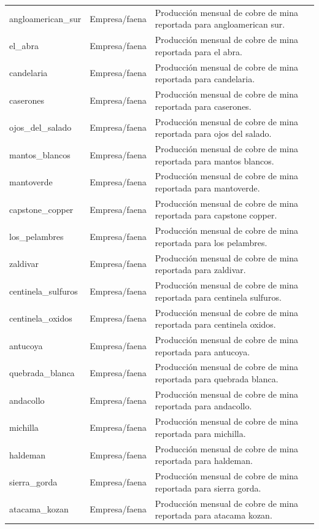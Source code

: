 \begin{longtable}{p{}p{}p{}}
angloamerican\_sur & Empresa/faena & Producción mensual de cobre de mina reportada para angloamerican sur. \\
el\_abra & Empresa/faena & Producción mensual de cobre de mina reportada para el abra. \\
candelaria & Empresa/faena & Producción mensual de cobre de mina reportada para candelaria. \\
caserones & Empresa/faena & Producción mensual de cobre de mina reportada para caserones. \\
ojos\_del\_salado & Empresa/faena & Producción mensual de cobre de mina reportada para ojos del salado. \\
mantos\_blancos & Empresa/faena & Producción mensual de cobre de mina reportada para mantos blancos. \\
mantoverde & Empresa/faena & Producción mensual de cobre de mina reportada para mantoverde. \\
capstone\_copper & Empresa/faena & Producción mensual de cobre de mina reportada para capstone copper. \\
los\_pelambres & Empresa/faena & Producción mensual de cobre de mina reportada para los pelambres. \\
zaldivar & Empresa/faena & Producción mensual de cobre de mina reportada para zaldivar. \\
centinela\_sulfuros & Empresa/faena & Producción mensual de cobre de mina reportada para centinela sulfuros. \\
centinela\_oxidos & Empresa/faena & Producción mensual de cobre de mina reportada para centinela oxidos. \\
antucoya & Empresa/faena & Producción mensual de cobre de mina reportada para antucoya. \\
quebrada\_blanca & Empresa/faena & Producción mensual de cobre de mina reportada para quebrada blanca. \\
andacollo & Empresa/faena & Producción mensual de cobre de mina reportada para andacollo. \\
michilla & Empresa/faena & Producción mensual de cobre de mina reportada para michilla. \\
haldeman & Empresa/faena & Producción mensual de cobre de mina reportada para haldeman. \\
sierra\_gorda & Empresa/faena & Producción mensual de cobre de mina reportada para sierra gorda. \\
atacama\_kozan & Empresa/faena & Producción mensual de cobre de mina reportada para atacama kozan. \\

\end{longtable}
